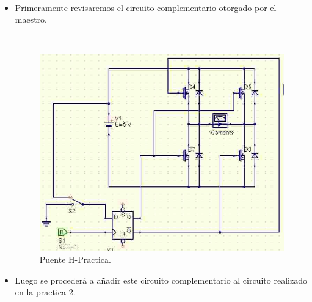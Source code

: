 \documentclass[12pt,letterpaper]{article}
\begin{document}
\
\begin{itemize}
\item Primeramente revisaremos el circuito complementario otorgado por el maestro.

\
\begin{figure}[h!]
\begin{center}
\includegraphics[scale=0.5]{PuenteH.jpg}
\caption{Puente H-Practica.}
\end{center}
\end{figure}

\item Luego se procederá a añadir este circuito complementario al circuito realizado en la practica 2.


\end{itemize}
\end{document}

